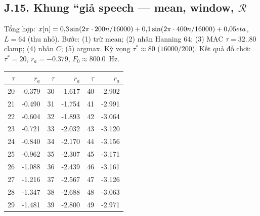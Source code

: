 \subsection*{J.15. Khung ``giả speech --- mean, window, $\mathcal{R}$}
Tổng hợp: $x[n]=0{,}3\sin(2\pi\cdot200 n/16000)+0{,}1\sin(2\pi\cdot400 n/16000)+0{,}05\\eta$, $L=64$ (thu nhỏ).
Bước: (1) trừ mean; (2) nhân Hanning 64; (3) MAC $\tau=32..80$ clamp; (4) nhân $C$; (5) argmax. Kỳ vọng $\tau^*\approx80$ ($16000/200$).
Kết quả đồ chơi: $\tau^*=20$, $r_a=-0.379$, $F_0\approx800.0$~Hz.
\begin{center}\scriptsize
\begin{tabular}{@{}rrrrrr@{}}
\toprule $\tau$ & $r_a$ & $\tau$ & $r_a$ & $\tau$ & $r_a$ \\ \midrule
20 & -0.379 & 30 & -1.617 & 40 & -2.902 \\
21 & -0.490 & 31 & -1.754 & 41 & -2.991 \\
22 & -0.604 & 32 & -1.893 & 42 & -3.064 \\
23 & -0.721 & 33 & -2.032 & 43 & -3.120 \\
24 & -0.840 & 34 & -2.170 & 44 & -3.156 \\
25 & -0.962 & 35 & -2.307 & 45 & -3.171 \\
26 & -1.088 & 36 & -2.439 & 46 & -3.161 \\
27 & -1.216 & 37 & -2.567 & 47 & -3.126 \\
28 & -1.347 & 38 & -2.688 & 48 & -3.063 \\
29 & -1.481 & 39 & -2.800 & 49 & -2.971 \\
\bottomrule\end{tabular}\end{center}

\newpage
